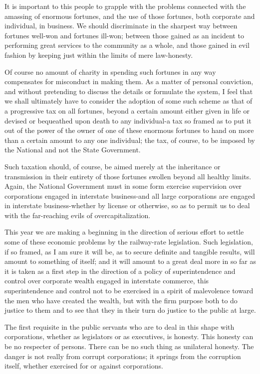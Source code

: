 \documentclass[a4paper]{amsbook}
\begin{document}
It is important to this people to grapple with the problems connected with the amassing of enormous fortunes, and the use of those fortunes, both corporate and individual, in business. We should discriminate in the sharpest way between fortunes well-won and fortunes ill-won; between those gained as an incident to performing great services to the community as a whole, and those gained in evil fashion by keeping just within the limits of mere law-honesty.

Of course no amount of charity in spending such fortunes in any way compensates for misconduct in making them. As a matter of personal conviction, and without pretending to discuss the details or formulate the system, I feel that we shall ultimately have to consider the adoption of some such scheme as that of a progressive tax on all fortunes, beyond a certain amount either given in life or devised or bequeathed upon death to any individual-a tax so framed as to put it out of the power of the owner of one of these enormous fortunes to hand on more than a certain amount to any one individual; the tax, of course, to be imposed by the National and not the State Government.

Such taxation should, of course, be aimed merely at the inheritance or transmission in their entirety of those fortunes swollen beyond all healthy limits. Again, the National Government must in some form exercise supervision over corporations engaged in interstate business-and all large corporations are engaged in interstate business-whether by license or otherwise, so as to permit us to deal with the far-reaching evils of overcapitalization.

This year we are making a beginning in the direction of serious effort to settle some of these economic problems by the railway-rate legislation. Such legislation, if so framed, as I am sure it will be, as to secure definite and tangible results, will amount to something of itself; and it will amount to a great deal more in so far as it is taken as a first step in the direction of a policy of superintendence and control over corporate wealth engaged in interstate commerce, this superintendence and control not to be exercised in a spirit of malevolence toward the men who have created the wealth, but with the firm purpose both to do justice to them and to see that they in their turn do justice to the public at large.

The first requisite in the public servants who are to deal in this shape with corporations, whether as legislators or as executives, is honesty. This honesty can be no respecter of persons. There can be no such thing as unilateral honesty. The danger is not really from corrupt corporations; it springs from the corruption itself, whether exercised for or against corporations.
\end{document}

